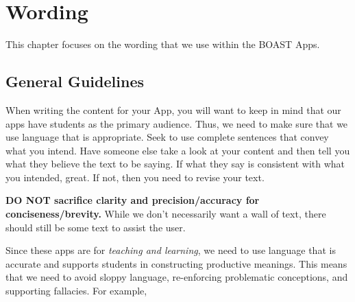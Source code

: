 \documentclass[
]{book}
\begin{document}
\hypertarget{wording}{%
\chapter{Wording}\label{wording}}

This chapter focuses on the wording that we use within the BOAST Apps.

\hypertarget{general-guidelines}{%
\section{General Guidelines}\label{general-guidelines}}

When writing the content for your App, you will want to keep in mind that our apps have students as the primary audience. Thus, we need to make sure that we use language that is appropriate. Seek to use complete sentences that convey what you intend. Have someone else take a look at your content and then tell you what they believe the text to be saying. If what they say is consistent with what you intended, great. If not, then you need to revise your text.

\textbf{DO NOT sacrifice clarity and precision/accuracy for
conciseness/brevity.} While we don't necessarily want a wall of text, there should still be some text to assist the user.

Since these apps are for \emph{teaching and learning}, we need to use language that is accurate and supports students in constructing productive meanings. This means that we need to avoid sloppy language, re-enforcing problematic conceptions, and supporting fallacies. For example,
\end{document}
